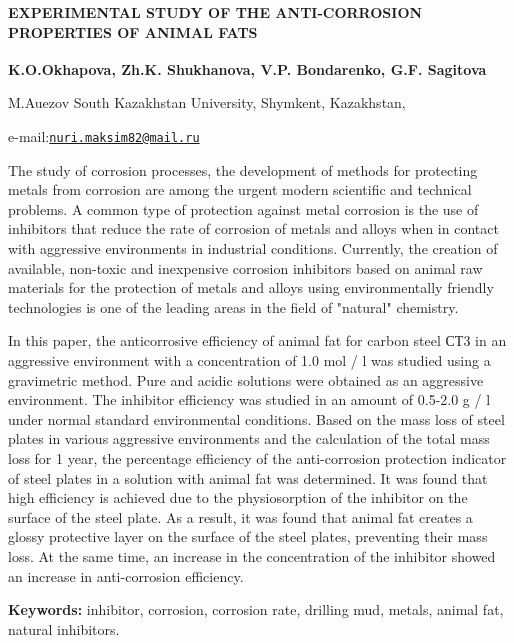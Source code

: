 \begin{articleheader}

{\bfseries EXPERIMENTAL STUDY OF THE ANTI-CORROSION PROPERTIES OF ANIMAL
FATS}

{\bfseries K.O.Okhapova\textsuperscript{\envelope }, Zh.K. Shukhanova, V.P.
Bondarenko, G.F. Sagitova}
\end{articleheader}
\begin{affiliation}

M.Auezov South Kazakhstan University, Shymkent, Kazakhstan,

e-mail:\href{mailto:nuri.maksim82@mail.ru}{\nolinkurl{nuri.maksim82@mail.ru}}
\end{affiliation}

The study of corrosion processes, the development of methods for
protecting metals from corrosion are among the urgent modern scientific
and technical problems. A common type of protection against metal
corrosion is the use of inhibitors that reduce the rate of corrosion of
metals and alloys when in contact with aggressive environments in
industrial conditions. Currently, the creation of available, non-toxic
and inexpensive corrosion inhibitors based on animal raw materials for
the protection of metals and alloys using environmentally friendly
technologies is one of the leading areas in the field of "natural"
chemistry.

In this paper, the anticorrosive efficiency of animal fat for carbon
steel СТ3 in an aggressive environment with a concentration of 1.0 mol /
l was studied using a gravimetric method. Pure and acidic solutions were
obtained as an aggressive environment. The inhibitor efficiency was
studied in an amount of 0.5-2.0 g / l under normal standard
environmental conditions. Based on the mass loss of steel plates in
various aggressive environments and the calculation of the total mass
loss for 1 year, the percentage efficiency of the anti-corrosion
protection indicator of steel plates in a solution with animal fat was
determined. It was found that high efficiency is achieved due to the
physiosorption of the inhibitor on the surface of the steel plate. As a
result, it was found that animal fat creates a glossy protective layer
on the surface of the steel plates, preventing their mass loss. At the
same time, an increase in the concentration of the inhibitor showed an
increase in anti-corrosion efficiency.

{\bfseries Keywords:} inhibitor, corrosion, corrosion rate, drilling mud,
metals, animal fat, natural inhibitors.

